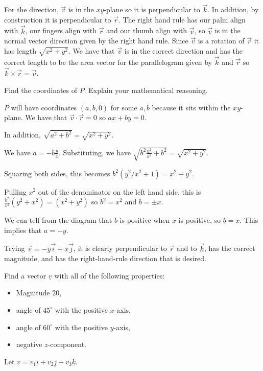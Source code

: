 \documentclass[12pt,letterpaper]{exam}
\newcommand{\mb}[1]{\underline{#1}}
\begin{document}
\begin{questions}
\begin{parts}
\begin{solution}
For the direction, $\vec{v}$ is in the $xy$-plane so it is perpendicular to $\vec{k}$.  In addition, by construction it is perpendicular to $\vec{r}$.  The right hand rule has our palm align with $\vec{k}$, our fingers align with $\vec{r}$ and our thumb align with $\vec{v}$, so $\vec v$ is in the normal vector direction given by the right hand rule.  Since $\vec{v}$ is a rotation of $\vec{r}$ it has length $\sqrt{x^2+y^2}$.  We have that $\vec{v}$ is in the correct direction and has the correct length to be the area vector for the parallelogram given by $\vec{k}$ and $\vec{r}$ so $\vec{k}\times\vec{r} = \vec{v}$.

\end{solution}

\item Find the coordinates of $P$.  Explain your mathematical reasoning.
\begin{solution}
$P$ will have coordinates $(a,b,0)$ for some $a,b$ because it sits within the $xy$-plane.  We have that $\vec{v} \cdot\vec{r} = 0$ so $a x + by = 0$.  

In addition, $\sqrt{a^2+b^2} = \sqrt{x^2+y^2}$.

We have $ a= -b\frac{y}{x}$.  Substituting, we have $\sqrt{b^2\frac{y^2}{x^2}+b^2} = \sqrt{x^2+y^2}.$

Squaring both sides, this becomes $b^2(y^2/x^2+1) = x^2 + y^2$.

Pulling $x^2$ out of the denominator on the left hand side, this is $\frac{b^2}{x^2}(y^2+x^2) = (x^2+y^2)$ so
$b^2 = x^2$ and $b = \pm x$.

We can tell from the diagram that $b$ is positive when $x$ is positive, so $b = x$.  This implies that $a = -y$.

Trying $\vec{v} = -y\vec{i} + x\vec{j}$, it is clearly perpendicular to $\vec{r}$ and to $\vec{k}$, has the correct magnitude, and has the right-hand-rule direction that is desired. 
\end{solution}


\end{parts}

\item 
\begin{parts}
\item Find a vector $\mb{v}$ with all of the following properties: 
\begin{itemize}
\itemsep0em
\item Magnitude $20$, \item angle of $45^\circ$ with the positive $x$-axis, \item angle of $60^\circ$ with the positive $y$-axis, \item negative $z$-component.
\end{itemize}
\begin{solution}
Let $\mb v = v_1 \mb i + v_2 \mb j + v_3 \mb k.$


\end{solution}
\end{parts}
\end{questions}
\end{document}
